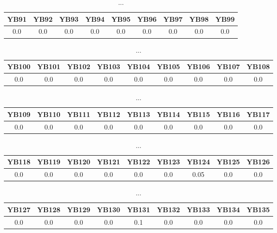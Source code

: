 \documentclass[]{article}
\begin{document}
\begin{table}[h]
      \centering
      \begin{tabular}{|c|c|c|c|c|c|c|c|c|}
            \hline
            YB91 & YB92 & YB93 & YB94 & YB95 & YB96 & YB97 & YB98 & YB99 \\
            \hline
            0.0  & 0.0  & 0.0  & 0.0  & 0.0  & 0.0  & 0.0  & 0.0  & 0.0  \\
            \hline
      \end{tabular}
      \caption{...}
\end{table}
\begin{table}[h]
      \centering
      \begin{tabular}{|c|c|c|c|c|c|c|c|c|}
            \hline
            YB100 & YB101 & YB102 & YB103 & YB104 & YB105 & YB106 & YB107 & YB108 \\
            \hline
            0.0   & 0.0   & 0.0   & 0.0   & 0.0   & 0.0   & 0.0   & 0.0   & 0.0   \\
            \hline
      \end{tabular}
      \caption{...}
\end{table}
\begin{table}[h]
      \centering
      \begin{tabular}{|c|c|c|c|c|c|c|c|c|}
            \hline
            YB109 & YB110 & YB111 & YB112 & YB113 & YB114 & YB115 & YB116 & YB117 \\
            \hline
            0.0   & 0.0   & 0.0   & 0.0   & 0.0   & 0.0   & 0.0   & 0.0   & 0.0   \\
            \hline
      \end{tabular}
      \caption{...}
\end{table}
\begin{table}[h]
      \centering
      \begin{tabular}{|c|c|c|c|c|c|c|c|c|}
            \hline
            YB118 & YB119 & YB120 & YB121 & YB122 & YB123 & YB124 & YB125 & YB126 \\
            \hline
            0.0   & 0.0   & 0.0   & 0.0   & 0.0   & 0.0   & 0.05  & 0.0   & 0.0   \\
            \hline
      \end{tabular}
      \caption{...}
\end{table}
\begin{table}[h]
      \centering
      \begin{tabular}{|c|c|c|c|c|c|c|c|c|}
            \hline
            YB127 & YB128 & YB129 & YB130 & YB131 & YB132 & YB133 & YB134 & YB135 \\
            \hline
            0.0   & 0.0   & 0.0   & 0.0   & 0.1   & 0.0   & 0.0   & 0.0   & 0.0   \\
            \hline
      \end{tabular}
      \caption{...}
\end{table}
\end{document}

